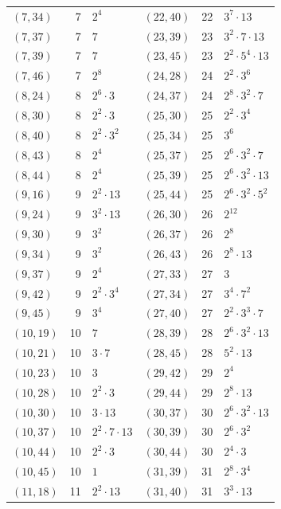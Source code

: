 \documentclass[11pt]{article}
\begin{document}
\begin{longtable}{@{}lrl@{\qquad}lrl@{}}
$(7,34)$ & 7 & $2^{4}$ & $(22,40)$ & 22 & $3^{7}\cdot 13$\\
$(7,37)$ & 7 & $7$ & $(23,39)$ & 23 & $3^{2}\cdot 7\cdot 13$\\
$(7,39)$ & 7 & $7$ & $(23,45)$ & 23 & $2^{2}\cdot 5^{4}\cdot 13$\\
$(7,46)$ & 7 & $2^{8}$ & $(24,28)$ & 24 & $2^{2}\cdot 3^{6}$\\
$(8,24)$ & 8 & $2^{6}\cdot 3$ & $(24,37)$ & 24 & $2^{8}\cdot 3^{2}\cdot 7$\\
$(8,30)$ & 8 & $2^{2}\cdot 3$ & $(25,30)$ & 25 & $2^{2}\cdot 3^{4}$\\
$(8,40)$ & 8 & $2^{2}\cdot 3^{2}$ & $(25,34)$ & 25 & $3^{6}$\\
$(8,43)$ & 8 & $2^{4}$ & $(25,37)$ & 25 & $2^{6}\cdot 3^{2}\cdot 7$\\
$(8,44)$ & 8 & $2^{4}$ & $(25,39)$ & 25 & $2^{6}\cdot 3^{2}\cdot 13$\\
$(9,16)$ & 9 & $2^{2}\cdot 13$ & $(25,44)$ & 25 & $2^{6}\cdot 3^{2}\cdot 5^{2}$\\
$(9,24)$ & 9 & $3^{2}\cdot 13$ & $(26,30)$ & 26 & $2^{12}$\\
$(9,30)$ & 9 & $3^{2}$ & $(26,37)$ & 26 & $2^{8}$\\
$(9,34)$ & 9 & $3^{2}$ & $(26,43)$ & 26 & $2^{8}\cdot 13$\\
$(9,37)$ & 9 & $2^{4}$ & $(27,33)$ & 27 & $3$\\
$(9,42)$ & 9 & $2^{2}\cdot 3^{4}$ & $(27,34)$ & 27 & $3^{4}\cdot 7^{2}$\\
$(9,45)$ & 9 & $3^{4}$ & $(27,40)$ & 27 & $2^{2}\cdot 3^{3}\cdot 7$\\
$(10,19)$ & 10 & $7$ & $(28,39)$ & 28 & $2^{6}\cdot 3^{2}\cdot 13$\\
$(10,21)$ & 10 & $3\cdot 7$ & $(28,45)$ & 28 & $5^{2}\cdot 13$\\
$(10,23)$ & 10 & $3$ & $(29,42)$ & 29 & $2^{4}$\\
$(10,28)$ & 10 & $2^{2}\cdot 3$ & $(29,44)$ & 29 & $2^{8}\cdot 13$\\
$(10,30)$ & 10 & $3\cdot 13$ & $(30,37)$ & 30 & $2^{6}\cdot 3^{2}\cdot 13$\\
$(10,37)$ & 10 & $2^{2}\cdot 7\cdot 13$ & $(30,39)$ & 30 & $2^{6}\cdot 3^{2}$\\
$(10,44)$ & 10 & $2^{2}\cdot 3$ & $(30,44)$ & 30 & $2^{4}\cdot 3$\\
$(10,45)$ & 10 & $1$ & $(31,39)$ & 31 & $2^{8}\cdot 3^{4}$\\
$(11,18)$ & 11 & $2^{2}\cdot 13$ & $(31,40)$ & 31 & $3^{3}\cdot 13$\\

\end{longtable}
\end{document}
